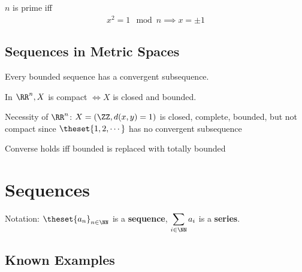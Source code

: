 \begin{proposition}

\(n\) is prime iff
\begin{align*}
x^2 = 1 \mod n \implies x = \pm 1
\end{align*}

\end{proposition}

\hypertarget{sequences-in-metric-spaces}{%
\subsection{Sequences in Metric
Spaces}\label{sequences-in-metric-spaces}}

\begin{theorem}

Every bounded sequence has a convergent subsequence.

\end{theorem}

\begin{theorem}

In \(\RR^n, X\) is compact \(\iff X\) is closed and bounded.

\end{theorem}

\begin{remark}

Necessity of \(\RR^n\): \(X = (\ZZ, d(x,y) = 1)\) is closed, complete,
bounded, but not compact since \(\theset{1,2,\cdots}\) has no convergent
subsequence

\end{remark}

\begin{proposition}

Converse holds iff bounded is replaced with totally bounded

\end{proposition}

\hypertarget{sequences}{%
\section{Sequences}\label{sequences}}

Notation: \(\theset{a_n}_{n\in\NN}\) is a \textbf{sequence},
\(\displaystyle\sum_{i\in\NN} a_i\) is a \textbf{series}.

\hypertarget{known-examples}{%
\subsection{Known Examples}\label{known-examples}}

